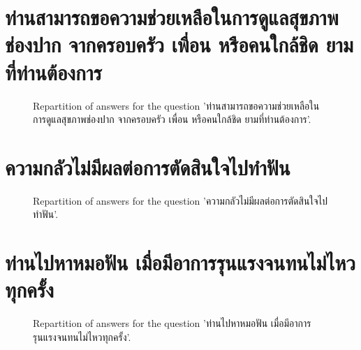\documentclass[12pt]{article}
\begin{document}
\clearpage{}
\section{ท่านสามารถขอความช่วยเหลือในการดูแลสุขภาพช่องปาก จากครอบครัว เพื่อน หรือคนใกล้ชิด ยามที่ท่านต้องการ}

\label{sec:120}


\begin{figure}[h!]
    \caption{\label{figure:q120-1}Repartition of answers for the question 'ท่านสามารถขอความช่วยเหลือในการดูแลสุขภาพช่องปาก จากครอบครัว เพื่อน หรือคนใกล้ชิด ยามที่ท่านต้องการ'.}
\end{figure}



\clearpage{}
\section{ความกลัวไม่มีผลต่อการตัดสินใจไปทำฟัน}

\label{sec:121}


\begin{figure}[h!]
    \caption{\label{figure:q121-1}Repartition of answers for the question 'ความกลัวไม่มีผลต่อการตัดสินใจไปทำฟัน'.}
\end{figure}



\clearpage{}
\section{ท่านไปหาหมอฟัน เมื่อมีอาการรุนแรงจนทนไม่ไหวทุกครั้ง}

\label{sec:122}


\begin{figure}[h!]
    \caption{\label{figure:q122-1}Repartition of answers for the question 'ท่านไปหาหมอฟัน เมื่อมีอาการรุนแรงจนทนไม่ไหวทุกครั้ง'.}
\end{figure}
\end{document}
